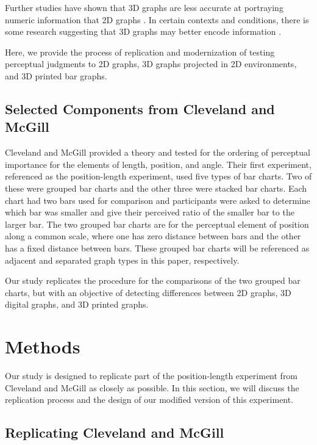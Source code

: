 \documentclass[letterpaper,inpress]{jdsart}
\begin{document}
Further studies have shown that 3D graphs are less accurate at portraying numeric information that 2D graphs \citep{barfield_effects_1989,fisher_data_1997}. In certain contexts and conditions, there is some research suggesting that 3D graphs may better encode information \citep{brath_3d_2014}.

Here, we provide the process of replication and modernization of testing perceptual judgments to 2D graphs, 3D graphs projected in 2D environments, and 3D printed bar graphs.

\hypertarget{selected-components-from-cleveland-and-mcgill}{%
\subsection{Selected Components from Cleveland and McGill}\label{selected-components-from-cleveland-and-mcgill}}

Cleveland and McGill provided a theory and tested for the ordering of perceptual importance for the elements of length, position, and angle.
Their first experiment, referenced as the position-length experiment, used five types of bar charts.
Two of these were grouped bar charts and the other three were stacked bar charts.
Each chart had two bars used for comparison and participants were asked to determine which bar was smaller and give their perceived ratio of the smaller bar to the larger bar.
The two grouped bar charts are for the perceptual element of position along a common scale, where one has zero distance between bars and the other has a fixed distance between bars.
These grouped bar charts will be referenced as adjacent and separated graph types in this paper, respectively.

Our study replicates the procedure for the comparisons of the two grouped bar charts, but with an objective of detecting differences between 2D graphs, 3D digital graphs, and 3D printed graphs.

\hypertarget{methods}{%
\section{Methods}\label{methods}}

Our study is designed to replicate part of the position-length experiment from Cleveland and McGill as closely as possible.
In this section, we will discuss the replication process and the design of our modified version of this experiment.

\hypertarget{replicating-cleveland-and-mcgill}{%
\subsection{Replicating Cleveland and McGill}\label{replicating-cleveland-and-mcgill}}
\end{document}
